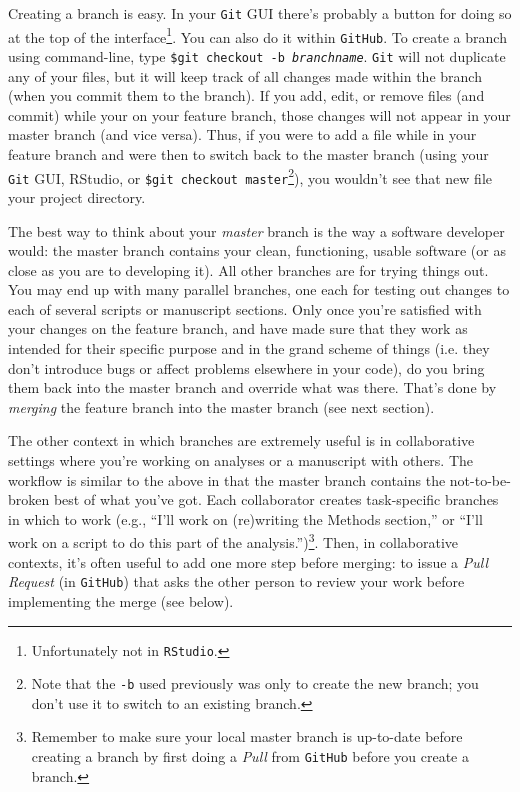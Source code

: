 \documentclass[12pt,letterpaper]{article}
\begin{document}
Creating a branch is easy.
In your \texttt{Git} GUI there's probably a button for doing so at the top of the interface\footnote{Unfortunately not in \texttt{RStudio}.}.
You can also do it within \texttt{GitHub}.
To create a branch using command-line, type \texttt{\$git checkout -b \emph{branchname}}.
\texttt{Git} will not duplicate any of your files, but it will keep track of all changes made within the branch (when you commit them to the branch).
If you add, edit, or remove files (and commit) while your on your feature branch, those changes will not appear in your master branch (and vice versa).
Thus, if you were to add a file while in your feature branch and were then to switch back to the master branch (using your \texttt{Git} GUI, RStudio, or \texttt{\$git checkout master}\footnote{Note that the \texttt{-b} used previously was only to create the new branch; you don't use it to switch to an existing branch.}), you wouldn't see that new file your project directory.

The best way to think about your \emph{master} branch is the way a software developer would:
the master branch contains your clean, functioning, usable software (or as close as you are to developing it).
All other branches are for trying things out.
You may end up with many parallel branches, one each for testing out changes to each of several scripts or manuscript sections.
Only once you're satisfied with your changes on the feature branch, and have made sure that they work as intended for their specific purpose and in the grand scheme of things (i.e. they don't introduce bugs or affect problems elsewhere in your code), do you bring them back into the master branch and override what was there.
That's done by \emph{merging} the feature branch into the master branch (see next section).

The other context in which branches are extremely useful is in collaborative settings where you're working on analyses or a manuscript with others.
The workflow is similar to the above in that the master branch contains the not-to-be-broken best of what you've got.
Each collaborator creates task-specific branches in which to work (e.g., ``I'll work on (re)writing the Methods section,'' or ``I'll work on a script to do this part of the analysis.'')\footnote{Remember to make sure your local master branch is up-to-date before creating a branch by first doing a \emph{Pull} from \texttt{GitHub} before you create a branch.}.
Then, in collaborative contexts, it's often useful to add one more step before merging:  to issue a \emph{Pull Request} (in \texttt{GitHub}) that asks the other person to review your work before implementing the merge (see below).
\end{document}
